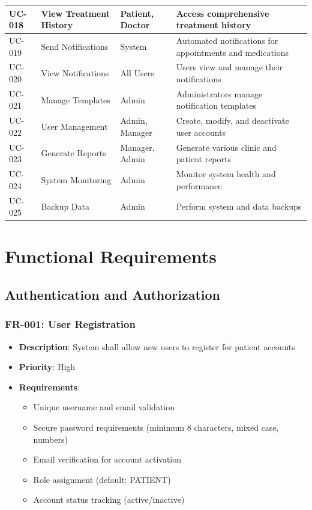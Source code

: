 \documentclass[12pt,a4paper]{article}
\begin{document}
\begin{longtable}{|p{1cm}|p{3cm}|p{3cm}|p{7cm}|}
\hline
UC-018 & View Treatment History & Patient, Doctor & Access comprehensive treatment history \\
\hline
UC-019 & Send Notifications & System & Automated notifications for appointments and medications \\
\hline
UC-020 & View Notifications & All Users & Users view and manage their notifications \\
\hline
UC-021 & Manage Templates & Admin & Administrators manage notification templates \\
\hline
UC-022 & User Management & Admin, Manager & Create, modify, and deactivate user accounts \\
\hline
UC-023 & Generate Reports & Manager, Admin & Generate various clinic and patient reports \\
\hline
UC-024 & System Monitoring & Admin & Monitor system health and performance \\
\hline
UC-025 & Backup Data & Admin & Perform system and data backups \\
\hline
\end{longtable}

\section{Functional Requirements}

\subsection{Authentication and Authorization}

\subsubsection{FR-001: User Registration}
\begin{itemize}
    \item \textbf{Description}: System shall allow new users to register for patient accounts
    \item \textbf{Priority}: High
    \item \textbf{Requirements}:
    \begin{itemize}
        \item Unique username and email validation
        \item Secure password requirements (minimum 8 characters, mixed case, numbers)
        \item Email verification for account activation
        \item Role assignment (default: PATIENT)
        \item Account status tracking (active/inactive)
    \end{itemize}
\end{itemize}
\end{document}
